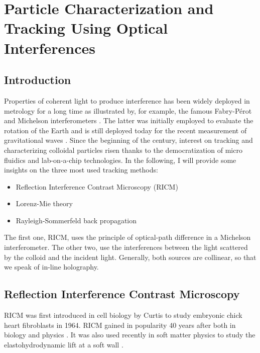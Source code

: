 \newpage
\section{Particle Characterization and Tracking Using Optical Interferences}
\label{sec:chapter2}

\subsection{Introduction}

Properties of coherent light to produce interference has been widely deployed in metrology for a long time as illustrated by, for example, the famous Fabry-Pérot  \cite{fabry_theorie_1899, perot_application_1899} and Michelson interferometers \cite{michelson_relative_1887}. The latter was initially employed to evaluate the rotation of the Earth and is still deployed today for the recent measurement of gravitational waves
\cite{ligo_scientific_collaboration_and_virgo_collaboration_gw151226_2016}. 
Since the beginning of the century, interest on tracking and characterizing colloidal particles risen thanks to the democratization of micro fluidics and lab-on-a-chip technologies. In the following, I will provide some insights on the three most used tracking methods:

\begin{itemize}
	\item Reflection Interference Contrast Microscopy (\gls{RICM})
	\item Lorenz-Mie theory
	\item Rayleigh-Sommerfeld back propagation
\end{itemize}

The first one, \gls{RICM}, uses the principle of optical-path difference in a Michelson interferometer. The other two, use the interferences between the light scattered by the colloid and the incident light. Generally, both sources are collinear, so that we speak of in-line holography. 



\subsection{Reflection Interference Contrast Microscopy}




\gls{RICM} was first introduced in cell biology by Curtis to study embryonic chick heart fibroblasts \cite{curtis_mechanism_1964} in 1964. \gls{RICM} gained in popularity 40 years after both in biology and physics \cite{filler_reflection_2000, siver_use_2000, weber_2_2003, limozin_quantitative_2009, nadal_probing_2002, raedler_measurement_1992}. It was also used recently in soft matter physics to study the elastohydrodynamic lift at a soft wall \cite{davies_elastohydrodynamic_2018}.

